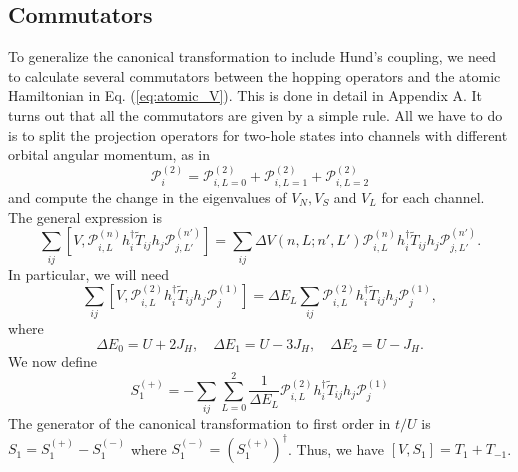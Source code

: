 \documentclass[11pt, a4paper]{article}
\begin{document}
\subsection{Commutators}
To generalize the canonical transformation to include Hund's coupling, we need to calculate several commutators between the hopping operators and the atomic Hamiltonian in Eq. (\ref{eq:atomic_V}). This is done in detail in Appendix A. It turns out that all the commutators are given by a simple rule. All we have to do is to split the projection operators for two-hole states into channels with different orbital angular momentum, as in
\begin{equation}
\mathcal{P}_i^{(2)} = \mathcal{P}_{i, L=0}^{(2)} + \mathcal{P}_{i, L=1}^{(2)} + \mathcal{P}_{i, L=2}^{(2)}
\end{equation}
and compute the change in the eigenvalues of $V_N, V_S$ and $V_L$ for each channel. The general expression is
\begin{equation}
\sum_{ij} [V, \mathcal{P}_{i, L}^{(n)} h_i^{\dagger} \tilde{T}_{ij} h_j \mathcal{P}_{j, L'}^{(n')}] = \sum_{ij} \Delta V(n, L; n', L') \mathcal{P}_{i, L}^{(n)} h_i^{\dagger} \tilde{T}_{ij} h_j \mathcal{P}_{j, L'}^{(n')}.
\end{equation}
In particular, we will need
\begin{equation}
\sum_{ij} [V, \mathcal{P}_{i, L}^{(2)} h_i^{\dagger} \tilde{T}_{ij} h_j \mathcal{P}_j^{(1)}] = \Delta E_L \sum_{ij} \mathcal{P}_{i, L}^{(2)} h_i^{\dagger} \tilde{T}_{ij} h_j \mathcal{P}_j^{(1)},
\end{equation}
where
\begin{equation}
\Delta E_0 = U + 2J_H, \quad \Delta E_1 = U - 3J_H, \quad \Delta E_2 = U - J_H.
\end{equation}
We now define
\begin{equation}
S_1^{(+)} = -\sum_{ij} \sum_{L=0}^2 \frac{1}{\Delta E_L} \mathcal{P}_{i, L}^{(2)} h_i^{\dagger} \tilde{T}_{ij} h_j \mathcal{P}_j^{(1)}
\end{equation}
The generator of the canonical transformation to first order in $t/U$ is $S_1 = S_1^{(+)} - S_1^{(-)}$ where $S_1^{(-)} = (S_1^{(+)})^{\dagger}$. Thus, we have $[V, S_1] = T_1 + T_{-1}$.
\end{document}
